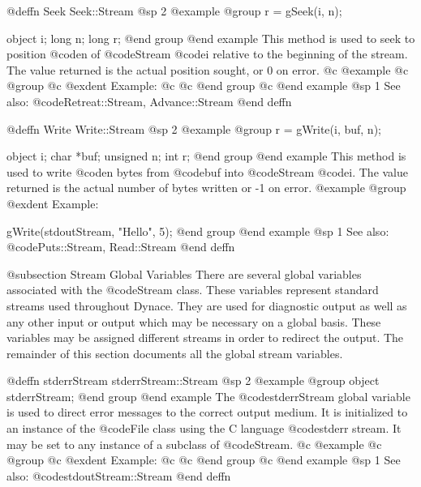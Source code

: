 @deffn {Seek} Seek::Stream
@sp 2
@example
@group
r = gSeek(i, n);

object  i;
long    n;
long    r;
@end group
@end example
This method is used to seek to position @code{n} of @code{Stream}
@code{i} relative to the beginning of the stream.
The value returned is the actual position sought, or 0 on error.
@c @example
@c @group
@c @exdent Example:
@c  
@c @end group
@c @end example
@sp 1
See also:  @code{Retreat::Stream, Advance::Stream}
@end deffn



















@deffn {Write} Write::Stream
@sp 2
@example
@group
r = gWrite(i, buf, n);

object  i;
char    *buf;
unsigned n;
int     r;
@end group
@end example
This method is used to write @code{n} bytes from @code{buf} into
@code{Stream} @code{i}.  The value returned is the actual number
of bytes written or -1 on error.
@example
@group
@exdent Example:
 
gWrite(stdoutStream, "Hello", 5);
@end group
@end example
@sp 1
See also:  @code{Puts::Stream, Read::Stream}
@end deffn




@subsection Stream Global Variables
There are several global variables associated with the @code{Stream}
class.  These variables represent standard streams used throughout
Dynace.  They are used for diagnostic output as well as any other input
or output which may be necessary on a global basis.  These variables may
be assigned different streams in order to redirect the output.  The
remainder of this section documents all the global stream variables.




@deffn {stderrStream} stderrStream::Stream
@sp 2
@example
@group
object  stderrStream;
@end group
@end example
The @code{stderrStream} global variable is used to direct error
messages to the correct output medium.  It is initialized to
an instance of the @code{File} class using the C language
@code{stderr} stream.  It may be set to any instance of a
subclass of @code{Stream}.
@c @example
@c @group
@c @exdent Example:
@c 
@c @end group
@c @end example
@sp 1
See also:  @code{stdoutStream::Stream}
@end deffn








